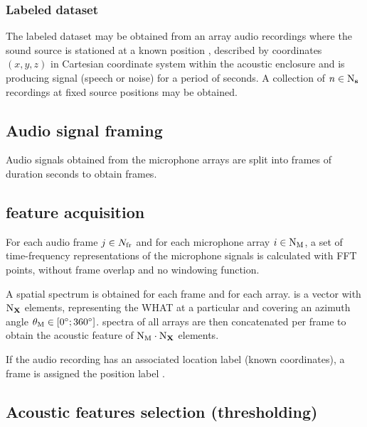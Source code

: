 \documentclass[applsci,article,submit,moreauthors,pdftex]{Definitions/mdpi}
\begin{document}
\subsubsection{Labeled dataset}
The labeled dataset may be obtained from an array audio recordings where the sound source is stationed at a known position \sposlabel{}, described by coordinates $ (x,y,z) $ in Cartesian coordinate system within the acoustic enclosure and is producing signal (speech or noise) for a period of  seconds. A collection of $ n \in \mathrm{N}_{\mathbf{s}} $ recordings at fixed source positions may be obtained.

\subsection{Audio signal framing}
Audio signals obtained from the microphone arrays are split into frames of duration \framedur{} seconds to obtain \Nframes{} frames. 

\subsection{\srpphat{} feature acquisition}
For each audio frame $ j{} \in N_{\mathrm{fr}}{} $ and for each microphone array $ i{} \in \mathrm{N}_{\mathrm{M}} $, a set of time-frequency representations of the microphone signals is calculated with \NFFT{} FFT points, without frame overlap and no windowing function. 

A \srpphat{} spatial spectrum \SRPspectrum{} is obtained for each frame and for each array. 
\SRPspectrum{} is a vector with $ \mathrm{N}_{\mathbf{X}} $ elements, representing the WHAT at a particular \doa{} and covering an azimuth angle $ \theta_{\mathrm{M}} \in [\ang{0};\ang{360}] $.
\srpphat{} spectra of all arrays are then concatenated per frame to obtain the acoustic feature \SRPfeature{} of $ \mathrm{N}_{\mathrm{M}} \cdot \mathrm{N}_{\mathbf{X}} $ elements.

If the audio recording has an associated location label (known coordinates), a frame is assigned the position label \sposlabel{}.

\subsection{Acoustic features selection (thresholding)}
\end{document}
